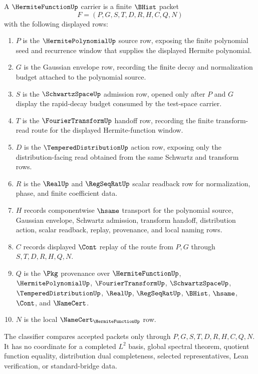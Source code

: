 \begin{definition}
\label{def:hermite-function-carrier}
A $\HermiteFunctionUp$ carrier is a finite $\BHist$ packet
$$
F=(P,G,S,T,D,R,H,C,Q,N)
$$
with the following displayed rows:
\begin{enumerate}
\item $P$ is the $\HermitePolynomialUp$ source row, exposing the finite polynomial seed and recurrence window that supplies the displayed Hermite polynomial.
\item $G$ is the Gaussian envelope row, recording the finite decay and normalization budget attached to the polynomial source.
\item $S$ is the $\SchwartzSpaceUp$ admission row, opened only after $P$ and $G$ display the rapid-decay budget consumed by the test-space carrier.
\item $T$ is the $\FourierTransformUp$ handoff row, recording the finite transform-read route for the displayed Hermite-function window.
\item $D$ is the $\TemperedDistributionUp$ action row, exposing only the distribution-facing read obtained from the same Schwartz and transform rows.
\item $R$ is the $\RealUp$ and $\RegSeqRatUp$ scalar readback row for normalization, phase, and finite coefficient data.
\item $H$ records componentwise $\hsame$ transport for the polynomial source, Gaussian envelope, Schwartz admission, transform handoff, distribution action, scalar readback, replay, provenance, and local naming rows.
\item $C$ records displayed $\Cont$ replay of the route from $P,G$ through $S,T,D,R,H,Q,N$.
\item $Q$ is the $\Pkg$ provenance over $\HermiteFunctionUp$, $\HermitePolynomialUp$, $\FourierTransformUp$, $\SchwartzSpaceUp$, $\TemperedDistributionUp$, $\RealUp$, $\RegSeqRatUp$, $\BHist$, $\hsame$, $\Cont$, and $\NameCert$.
\item $N$ is the local $\NameCert_{\HermiteFunctionUp}$ row.
\end{enumerate}
The classifier compares accepted packets only through $P,G,S,T,D,R,H,C,Q,N$. It has no coordinate for a completed $L^2$ basis, global spectral theorem, quotient function equality, distribution dual completeness, selected representatives, Lean verification, or standard-bridge data.
\end{definition}

